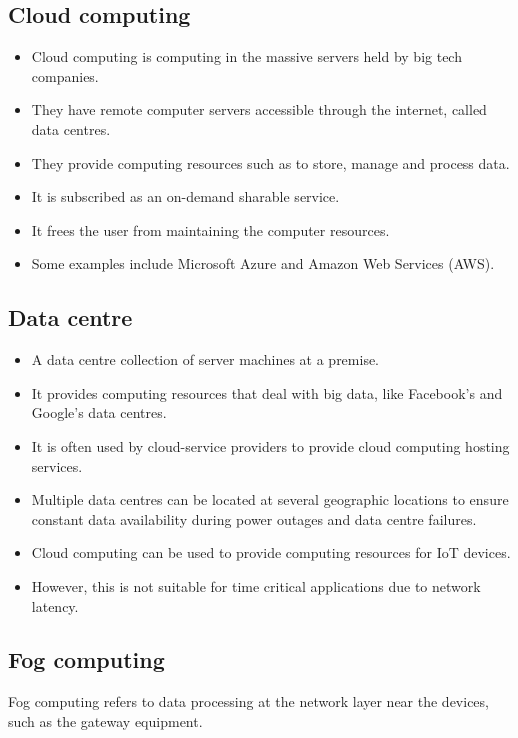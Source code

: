 \documentclass[11pt]{article}
\begin{document}
\subsection{Cloud computing}
\label{sec:org34abcae}
\begin{itemize}
\item Cloud computing is computing in the massive servers held by big tech companies.
\item They have remote computer servers accessible through the internet, called data centres.
\item They provide computing resources such as to store, manage and process data.
\item It is subscribed as an on-demand sharable service.
\item It frees the user from maintaining the computer resources.
\item Some examples include Microsoft Azure and Amazon Web Services (AWS).
\end{itemize}

\subsection{Data centre}
\label{sec:orge945f8f}
\begin{itemize}
\item A data centre collection of server machines at a premise.
\item It provides computing resources that deal with big data, like Facebook's and Google's data centres.
\item It is often used by cloud-service providers to provide cloud computing hosting services.
\item Multiple data centres can be located at several geographic locations to ensure constant data availability during power outages and data centre failures.
\item Cloud computing can be used to provide computing resources for IoT devices.
\item However, this is not suitable for time critical applications due to network latency.
\end{itemize}

\subsection{Fog computing}
\label{sec:org55e56b3}
Fog computing refers to data processing at the network layer near the devices, such as the gateway equipment.
\end{document}

